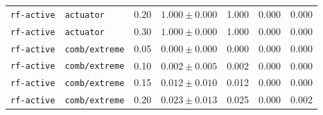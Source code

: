 \documentclass{article}
\begin{document}
\begin{center}
\begin{tabular}{lllcccc}
\texttt{rf-active} & \texttt{actuator} & 0.20 & $1.000 \pm 0.000$ & 1.000 & 0.000 & 0.000 \\
\texttt{rf-active} & \texttt{actuator} & 0.30 & $1.000 \pm 0.000$ & 1.000 & 0.000 & 0.000 \\
\texttt{rf-active} & \texttt{comb/extreme} & 0.05 & $0.000 \pm 0.000$ & 0.000 & 0.000 & 0.000 \\
\texttt{rf-active} & \texttt{comb/extreme} & 0.10 & $0.002 \pm 0.005$ & 0.002 & 0.000 & 0.000 \\
\texttt{rf-active} & \texttt{comb/extreme} & 0.15 & $0.012 \pm 0.010$ & 0.012 & 0.000 & 0.000 \\
\texttt{rf-active} & \texttt{comb/extreme} & 0.20 & $0.023 \pm 0.013$ & 0.025 & 0.000 & 0.002 \\
\bottomrule
\end{tabular}
\end{center}
\end{document}
